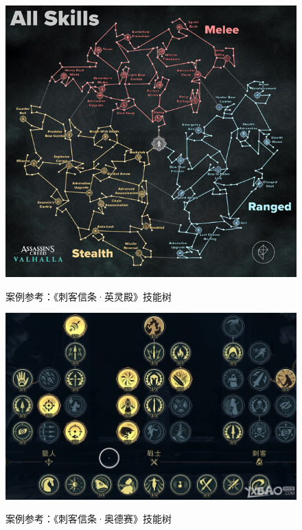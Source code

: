 \documentclass{article}  %
\begin{document}
\begin{figure}
\centering 
\includegraphics[width=1\textwidth]{ValhallaSkillTree} 
\caption{案例参考：《刺客信条·英灵殿》技能树} 
\label{ValhallaSkillTree} 
\cite{ValhallaSkillTree}
\end{figure}

\begin{figure}
\centering 
\includegraphics[width=1\textwidth]{OdysseySkillTree} 
\caption{案例参考：《刺客信条·奥德赛》技能树} 
\label{OdysseySkillTree} 
\cite{OdysseySkillTree}
\end{figure}
\end{document}
